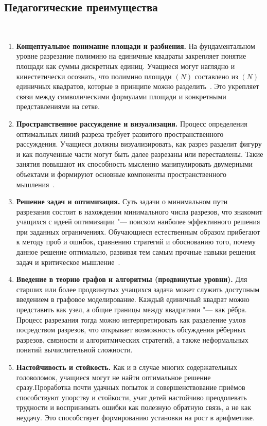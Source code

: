 \documentclass[a4paper,14pt]{extreport}
\theoremstyle{plain}
\theoremstyle{definition}
\theoremstyle{remark}
\begin{document}
\subsection{Педагогические преимущества}~\label{sec4.2.1}

\begin{enumerate}
	\item \textbf{Концептуальное понимание площади и разбиения.}
	На фундаментальном уровне разрезание полимино на единичные квадраты закрепляет понятие площади как суммы дискретных единиц. Учащиеся могут наглядно и кинестетически осознать, что полимино площади $(N)$ составлено из $(N)$ единичных квадратов, которые в принципе можно разделить~\cite{Boaler}. Это укрепляет связи между символическими формулами площади и конкретными представлениями на сетке. 
	
	\item \textbf{Пространственное рассуждение и визуализация.}
	Процесс определения оптимальных линий разреза требует развитого пространственного рассуждения. Учащиеся должны визуализировать, как разрез разделит фигуру и как полученные части могут быть далее разрезаны или переставлены. Такие занятия повышают их способность мысленно манипулировать двумерными объектами и формируют основные компоненты пространственного мышления~\cite{Puig}. 
	
	\item \textbf{Решение задач и оптимизация.}
	Суть задачи о минимальном пути разрезания состоит в нахождении минимального числа разрезов, что знакомит учащихся с идеей оптимизации "--- поиском наиболее эффективного решения при заданных ограничениях. Обучающиеся естественным образом прибегают к методу проб и ошибок, сравнению стратегий и обоснованию того, почему данное решение оптимально, развивая тем самым прочные навыки решения задач и критическое мышление~\cite{Ahdhianto}. 
	
	\item \textbf{Введение в теорию графов и алгоритмы (продвинутые уровни).}
	Для старших или более продвинутых учащихся задача может служить доступным введением в графовое моделирование. Каждый единичный квадрат можно представить как узел, а общие границы между квадратами "--- как рёбра. Процесс разрезания тогда можно интерпретировать как разделение узлов посредством разрезов, что открывает возможность обсуждения рёберных разрезов, связности и алгоритмических стратегий, а также неформальных понятий вычислительной сложности.
	
	\item \textbf{Настойчивость и стойкость.}
	Как и в случае многих содержательных головоломок, учащиеся могут не найти оптимальное решение сразу.Проработка почти удачных попыток и совершенствование приёмов способствуют упорству и стойкости, учат детей настойчиво преодолевать трудности и воспринимать ошибки как полезную обратную связь, а не как неудачу. Это способствует формированию установки на рост в арифметике.
\end{enumerate}
\end{document}
